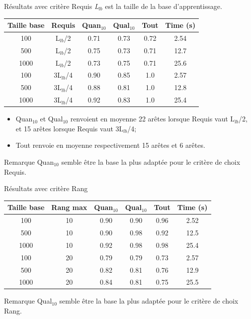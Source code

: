 \documentclass{beamer}
\begin{document}
\begin{frame}{Résultats avec critère Requis}
\emph{L$_{lb}$} est la taille de la base d'apprentissage. 

\centering
\begin{tabular}{|c|c|c|c|c|c|}
   \hline
   Taille base & Requis & Quan$_{10}$ & Qual$_{10}$ & Tout & Time (s)\\
   \hline
   100 & L$_{lb}$/2 & 0.71 & 0.73 & 0.72 & 2.54 \\
   \hline
   500 & L$_{lb}$/2 & 0.75 & 0.73 & 0.71 & 12.7 \\
   \hline
   1000 & L$_{lb}$/2 & 0.73 & 0.75 & 0.71 & 25.6 \\
   \hline
   \hline
   100 & 3L$_{lb}$/4 & 0.90 & 0.85 & 1.0 & 2.57 \\
   \hline
   500 & 3L$_{lb}$/4 & 0.88 & 0.81 & 1.0 & 12.8 \\
   \hline
   1000 & 3L$_{lb}$/4 & 0.92 & 0.83 & 1.0 & 25.4 \\
   \hline
\end{tabular}

\begin{itemize}
\item Quan$_{10}$ et Qual$_{10}$ renvoient en moyenne 22 arêtes lorsque Requis vaut L$_{lb}$/2, et 15 arêtes lorsque Requis vaut 3L$_{lb}$/4;
\item Tout renvoie en moyenne respectivement 15 arêtes et 6 arêtes.
\end{itemize}
\begin{exampleblock}{Remarque}
Quan$_{10}$ semble être la base la plus adaptée pour le critère de choix Requis.
\end{exampleblock}
\end{frame}

\begin{frame}{Résultats avec critère Rang}

\centering
\begin{tabular}{|c|c|c|c|c|c|}
   \hline
   Taille base & Rang max & Quan$_{10}$ & Qual$_{10}$ & Tout & Time (s)\\
   \hline
   100 & 10 & 0.90 & 0.90 & 0.96 & 2.52 \\
   \hline
   500 & 10 & 0.90 & 0.98 & 0.92 & 12.5 \\
   \hline
   1000 & 10 & 0.92 & 0.98 & 0.98 & 25.4 \\
   \hline
   \hline
   100 & 20 & 0.79 & 0.79 & 0.73 & 2.57 \\
   \hline
   500 & 20 & 0.82 & 0.81 & 0.76 & 12.9 \\
   \hline
   1000 & 20 & 0.84 & 0.81 & 0.75 & 25.5 \\
   \hline
\end{tabular}

\begin{exampleblock}{Remarque}
Qual$_{10}$ semble être la base la plus adaptée pour le critère de choix Rang.
\end{exampleblock}

\end{frame}
\end{document}
